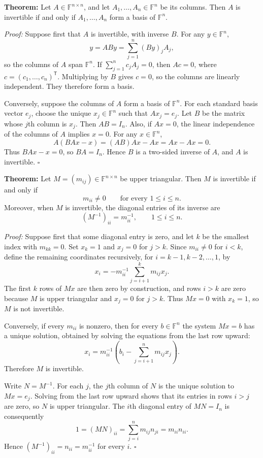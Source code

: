 \documentclass[a4paper,11pt,abstract=true]{scrartcl}
\theoremstyle{dotlessP}
\theoremstyle{dotlessS}
\theoremstyle{remark}
\theoremstyle{definition}
\begin{document}
\begin{problem_box}
\textbf{Theorem:} Let
$A\in\mathbb{F}^{n\times n}$, and let $A_1,\ldots,A_n\in\mathbb{F}^n$
be its columns. Then $A$ is invertible if and only if
$A_1,\ldots,A_n$ form a basis of $\mathbb{F}^n$.
\end{problem_box}

\begin{claim_box}
\textit{Proof:} Suppose first that $A$ is invertible, with inverse
$B$. For any $y\in\mathbb{F}^n$,
\[
y=AB y=\sum_{j=1}^n (By)_j A_j,
\]
so the columns of $A$ span $\mathbb{F}^n$. If
$\sum_{j=1}^n c_jA_j=0$, then $Ac=0$, where
$c=(c_1,\ldots,c_n)^{\mathsf T}$. Multiplying by $B$ gives $c=0$,
so the columns are linearly independent. They therefore form a basis.

Conversely, suppose the columns of $A$ form a basis of
$\mathbb{F}^n$. For each standard basis vector $e_j$, choose the unique
$x_j\in\mathbb{F}^n$ such that $Ax_j=e_j$. Let $B$ be the matrix whose
$j$th column is $x_j$. Then $AB=I_n$. Also, if $Ax=0$, the linear
independence of the columns of $A$ implies $x=0$. For any $x\in\mathbb{F}^n$,
\[
A(BAx-x)=(AB)Ax-Ax=Ax-Ax=0.
\]
Thus $BAx-x=0$, so $BA=I_n$. Hence $B$ is a two-sided inverse of $A$,
and $A$ is invertible. \hfill$\square$
\end{claim_box}

\begin{problem_box}
\textbf{Theorem:} Let $M=(m_{ij})\in\mathbb{F}^{n\times n}$ be upper
triangular. Then $M$ is invertible if and only if
\[
m_{ii}\neq 0\qquad\text{for every }1\leq i\leq n.
\]
Moreover, when $M$ is invertible, the diagonal entries of its inverse are
\[
(M^{-1})_{ii}=m_{ii}^{-1},\qquad 1\leq i\leq n.
\]
\end{problem_box}

\begin{claim_box}
\textit{Proof:} Suppose first that some diagonal entry is zero, and let
$k$ be the smallest index with $m_{kk}=0$. Set $x_k=1$ and $x_j=0$
for $j>k$. Since $m_{ii}\neq0$ for $i<k$, define the remaining
coordinates recursively, for $i=k-1,k-2,\ldots,1$, by
\[
x_i=-m_{ii}^{-1}\sum_{j=i+1}^{k}m_{ij}x_j.
\]
The first $k$ rows of $Mx$ are then zero by construction, and rows
$i>k$ are zero because $M$ is upper triangular and $x_j=0$ for $j>k$.
Thus $Mx=0$ with $x_k=1$, so $M$ is not invertible.

Conversely, if every $m_{ii}$ is nonzero, then for every
$b\in\mathbb{F}^n$ the system $Mx=b$ has a unique solution, obtained
by solving the equations from the last row upward:
\[
x_i=m_{ii}^{-1}\left(b_i-\sum_{j=i+1}^{n}m_{ij}x_j\right).
\]
Therefore $M$ is invertible.

Write $N=M^{-1}$. For each $j$, the $j$th column of $N$ is the unique
solution to $Mx=e_j$. Solving from the last row upward shows that its
entries in rows $i>j$ are zero, so $N$ is upper triangular. The $i$th
diagonal entry of $MN=I_n$ is consequently
\[
1=(MN)_{ii}=\sum_{j=i}^{n}m_{ij}n_{ji}=m_{ii}n_{ii}.
\]
Hence $(M^{-1})_{ii}=n_{ii}=m_{ii}^{-1}$ for every $i$.
\hfill$\square$
\end{claim_box}
\end{document}
